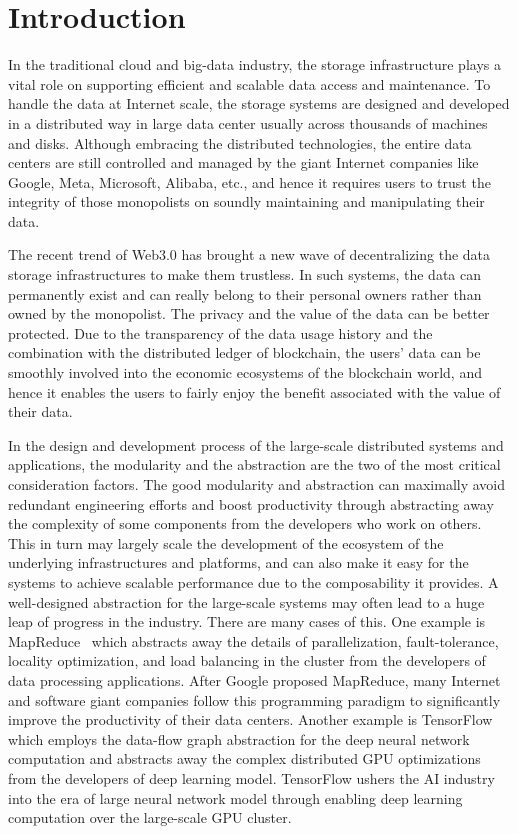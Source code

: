 \section{Introduction}

In the traditional cloud and big-data industry, the storage infrastructure plays a vital role on supporting efficient and scalable data access and maintenance. To handle the data at Internet scale, the storage systems are designed and developed in a distributed way in large data center usually across thousands of machines and disks. Although embracing the distributed technologies, the entire data centers are still controlled and managed by the giant Internet companies like Google, Meta, Microsoft, Alibaba, etc., and hence it requires users to trust the integrity of those monopolists on soundly maintaining and manipulating their data. 

The recent trend of Web3.0 has brought a new wave of decentralizing the data storage infrastructures to make them trustless. In such systems, the data can permanently exist and can really belong to their personal owners rather than owned by the monopolist. The privacy and the value of the data can be better protected. Due to the transparency of the data usage history and the combination with the distributed ledger of blockchain, the users’ data can be smoothly involved into the economic ecosystems of the blockchain world, and hence it enables the users to fairly enjoy the benefit associated with the value of their data.

In the design and development process of the large-scale distributed systems and applications, the modularity and the abstraction are the two of the most critical consideration factors. The good modularity and abstraction can maximally avoid redundant engineering efforts and boost productivity through abstracting away the complexity of some components from the developers who work on others. This in turn may largely scale the development of the ecosystem of the underlying infrastructures and platforms, and can also make it easy for the systems to achieve scalable performance due to the composability it provides. A well-designed abstraction for the large-scale systems may often lead to a huge leap of progress in the industry. There are many cases of this. One example is MapReduce~\cite{mapreduce} which abstracts away the details of parallelization, fault-tolerance, locality optimization, and load balancing in the cluster from the developers of data processing applications. After Google proposed MapReduce, many Internet and software giant companies follow this programming paradigm to significantly improve the productivity of their data centers. Another example is TensorFlow~\cite{tensorflow} which employs the data-flow graph abstraction for the deep neural network computation and abstracts away the complex distributed GPU optimizations from the developers of deep learning model. TensorFlow ushers the AI industry into the era of large neural network model through enabling deep learning computation over the large-scale GPU cluster. 


